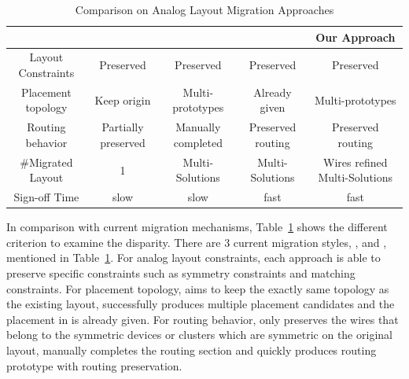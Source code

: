     \begin{table}
      \begin{center}
      \caption{Comparison on Analog Layout Migration Approaches}\label{table:MigrateComp}
      \scriptsize
      \begin{tabular}{|c|c|c|c|c|}
        \hline
        & \cite{msc-bhattacharya-tcad06} & \cite{ALP_YPWeng_iccad2011} & \cite{Chin_DMR_ICCAD2013} & Our Approach \\
        \hline
        Layout Constraints & Preserved & Preserved & Preserved & Preserved \\
        \hline
        Placement topology  & Keep origin & Multi-prototypes & Already given & Multi-prototypes \\
        \hline  
        Routing behavior  & Partially preserved &  Manually completed &  Preserved routing & Preserved routing \\
        \hline
        \#Migrated Layout &  1 &  Multi-Solutions & Multi-Solutions & Wires refined Multi-Solutions \\
        \hline
        Sign-off Time &   slow &  slow &  fast &  fast \\
        \hline
      \end{tabular}
      \end{center}
    \end{table}

    In comparison with current migration mechanisms, Table~\ref{table:MigrateComp} shows the different criterion to examine the disparity. There are 3 current migration styles, \cite{msc-bhattacharya-tcad06}, \cite{ALP_YPWeng_iccad2011} and \cite{Chin_DMR_ICCAD2013}, mentioned in Table~\ref{table:MigrateComp}. For analog layout constraints, each approach is able to preserve specific constraints such as symmetry constraints and matching constraints. For placement topology, \cite{msc-bhattacharya-tcad06} aims to keep the exactly same topology as the existing layout, \cite{ALP_YPWeng_iccad2011} successfully produces multiple placement candidates and the placement in \cite{Chin_DMR_ICCAD2013} is already given. For routing behavior, \cite{msc-bhattacharya-tcad06} only preserves the wires that belong to the symmetric devices or clusters which are symmetric on the original layout, \cite{ALP_YPWeng_iccad2011} manually completes the routing section and \cite{Chin_DMR_ICCAD2013} quickly produces routing prototype with routing preservation. 

